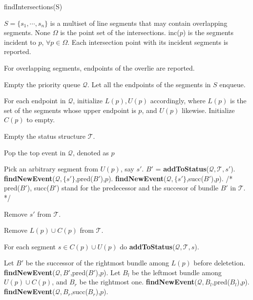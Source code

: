 \documentclass[a4paper]{article}
\begin{document}
\begin{algorithm}[htbp]
  \caption{findIntersections(S)}
  \label{alg:fi}
  \begin{algorithmic}[1]
    \renewcommand{\algorithmicrequire}{\textbf{Input : }}
    \REQUIRE $S = \{s_1,\cdots,s_n\}$ is a multiset of line segments
    that may contain overlapping segments.
    \renewcommand{\algorithmicrequire}{\textbf{Precondition : }}
    \REQUIRE None
    \renewcommand{\algorithmicensure}{\textbf{Output : }}
    \ENSURE $\Omega$ is the point set of the intersections.
    inc($p$) is the segments incident to $p$, $\forall p \in \Omega$.
    \renewcommand{\algorithmicensure}{\textbf{Postcondition : }}
    \ENSURE Each intersection point with its incident segments is reported.
    
    For overlapping segments, endpoints of the overlie are reported.
    
    \STATE Empty the priority queue $\mathcal{Q}$.
    Let all the endpoints of the segments in $S$ enqueue.

    \STATE For each endpoint in $\mathcal{Q}$,
    initialize $L(p), U(p)$ accordingly, 
    where $L(p)$ is the set of the segments whose upper endpoint is $p$,
    and $U(p)$ likewise.
    Initialize $C(p)$ to empty.

    \STATE Empty the status structure $\mathcal{T}$.
    \STATE 


      \STATE Pop the top event in $\mathcal{Q}$, denoted as $p$

      \STATE Pick an arbitrary segment from $U(p)$, say $s'$. 
      \STATE $B'$ = \textbf{addToStatus}($\mathcal{Q},\mathcal{T},s'$). 
      \STATE \textbf{findNewEvent}($\mathcal{Q},\{s'\}$,pred($B'$),$p$). 
      \STATE \textbf{findNewEvent}($\mathcal{Q},\{s'\}$,succ($B'$),$p$). 
      \STATE /* pred($B'$), succ($B'$) stand for the predecessor and the succesor
      of bundle $B'$ in $\mathcal{T}$. */

      \STATE Remove $s'$ from $\mathcal{T}$.
      \ENDIF
      \label{alg:incdone}

      \STATE Remove $L(p) \cup C(p)$ from $\mathcal{T}$.

      \STATE For each segment $s \in C(p) \cup U(p)$
      do \textbf{addToStatus}($\mathcal{Q},\mathcal{T},s$). 
      
      \label{alg:testadjbeg}
      \STATE Let $B'$ be the successor of the rightmost bundle
      among $L(p)$ before deletetion. 
      \STATE \textbf{findNewEvent}($\mathcal{Q},B'$,pred($B'$),$p$). 
      \ELSE
      \STATE Let $B_l$ be the leftmost bundle among $U(p) \cup C(p)$,
      and $B_r$ be the rightmost one. 
      \STATE \textbf{findNewEvent}($\mathcal{Q},B_l$,pred($B_l$),$p$). 
      \STATE \textbf{findNewEvent}($\mathcal{Q},B_r$,succ($B_r$),$p$). 
      \ENDIF
      \label{alg:testadjend}


\end{algorithmic}
\end{algorithm}
\end{document}
